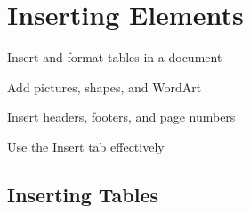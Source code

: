 \chapter{Inserting Elements}
\label{ch:word-insert}

\begin{objectives}
  \item Insert and format tables in a document
  \item Add pictures, shapes, and WordArt
  \item Insert headers, footers, and page numbers
  \item Use the Insert tab effectively
\end{objectives}


\section{Inserting Tables}
\label{sec:insert-tables}


